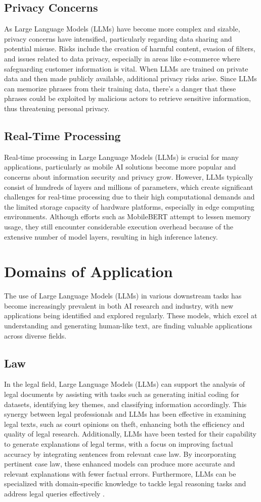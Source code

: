 \subsection{Privacy Concerns}
As Large Language Models (LLMs) have become more complex and sizable, privacy concerns have intensified, particularly regarding data sharing and potential misuse. Risks include the creation of harmful content, evasion of filters, and issues related to data privacy, especially in areas like e-commerce where safeguarding customer information is vital. When LLMs are trained on private data and then made publicly available, additional privacy risks arise. Since LLMs can memorize phrases from their training data, there's a danger that these phrases could be exploited by malicious actors to retrieve sensitive information, thus threatening personal privacy.
\subsection{Real-Time Processing}
Real-time processing in Large Language Models (LLMs) is crucial for many applications, particularly as mobile AI solutions become more popular and concerns about information security and privacy grow. However, LLMs typically consist of hundreds of layers and millions of parameters, which create significant challenges for real-time processing due to their high computational demands and the limited storage capacity of hardware platforms, especially in edge computing environments. Although efforts such as MobileBERT attempt to lessen memory usage, they still encounter considerable execution overhead because of the extensive number of model layers, resulting in high inference latency.
\section{Domains of Application}
The use of Large Language Models (LLMs) in various downstream tasks has become increasingly prevalent in both AI research and industry, with new applications being identified and explored regularly. These models, which excel at understanding and generating human-like text, are finding valuable applications across diverse fields. 
\subsection{Law} 
In the legal field, Large Language Models (LLMs) can support the analysis of legal documents by assisting with tasks such as generating initial coding for datasets, identifying key themes, and classifying information accordingly. This synergy between legal professionals and LLMs has been effective in examining legal texts, such as court opinions on theft, enhancing both the efficiency and quality of legal research. Additionally, LLMs have been tested for their capability to generate explanations of legal terms, with a focus on improving factual accuracy by integrating sentences from relevant case law. By incorporating pertinent case law, these enhanced models can produce more accurate and relevant explanations with fewer factual errors. Furthermore, LLMs can be specialized with domain-specific knowledge to tackle legal reasoning tasks and address legal queries effectively \cite{Naveed2024}.
